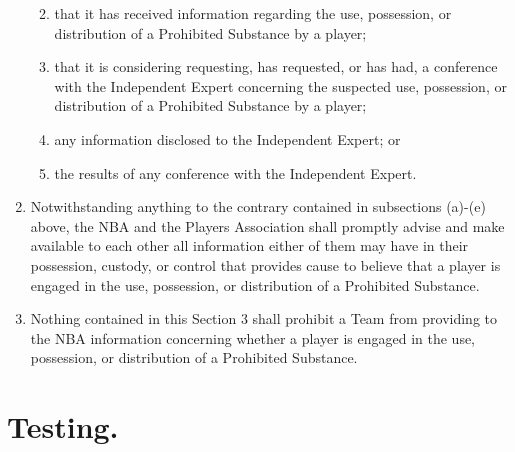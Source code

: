 \documentclass[
]{book}
\providecommand{\tightlist}{%
  \setlength{\itemsep}{0pt}\setlength{\parskip}{0pt}}
\begin{document}
\begin{enumerate}
  \begin{enumerate}
  \def\labelenumii{(\roman{enumii})}
  \tightlist
  \item
    that it has received information regarding the use, possession, or distribution of a Prohibited Substance by a player;
  \item
    that it is considering requesting, has requested, or has had, a conference with the Independent Expert concerning the suspected use, possession, or distribution of a Prohibited Substance by a player;
  \item
    any information disclosed to the Independent Expert; or
  \item
    the results of any conference with the Independent Expert.
  \end{enumerate}
\item
  Notwithstanding anything to the contrary contained in subsections (a)-(e) above, the NBA and the Players Association shall promptly advise and make available to each other all information either of them may have in their possession, custody, or control that provides cause to believe that a player is engaged in the use, possession, or distribution of a Prohibited Substance.
\item
  Nothing contained in this Section 3 shall prohibit a Team from providing to the NBA information concerning whether a player is engaged in the use, possession, or distribution of a Prohibited Substance.
\end{enumerate}

\hypertarget{testing.}{%
\section{Testing.}\label{testing.}}
\end{document}
